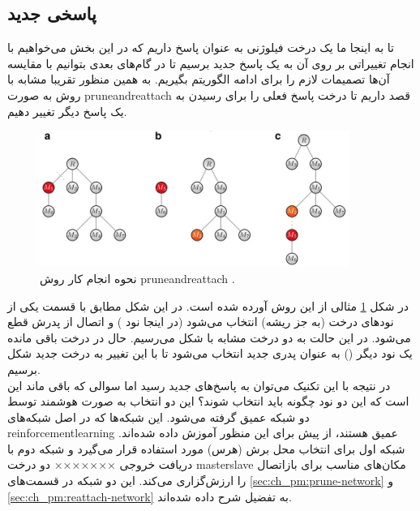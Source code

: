 \subsection{پاسخی جدید}
تا به اینجا ما یک درخت فیلوژنی به عنوان پاسخ داریم که در این بخش می‌خواهیم با انجام تغییراتی بر روی آن به یک پاسخ جدید برسیم تا در گام‌های بعدی بتوانیم با مقایسه آن‌ها تصمیمات لازم را برای ادامه الگوریتم بگیریم. به همین منظور تقریبا مشابه با روش \cite{davis2016computing} به صورت \gls{pruneandreattach} قصد داریم تا درخت پاسخ فعلی را برای رسیدن به یک پاسخ دیگر تغییر دهیم. 
\begin{figure}[!ht]
	\centering 
	\includegraphics[width=0.9\textwidth]{img/chaps/pm/pruneandreattach}
	\caption{نحوه انجام کار روش \gls{pruneandreattach} \cite{davis2016computing}.}    
	\label{fig:ch_pm:pruneandreattach}
\end{figure}
در شکل \ref{fig:ch_pm:pruneandreattach} مثالی از این روش آورده شده است. در این شکل مطابق با قسمت  یکی از نودهای درخت (به جز ریشه) انتخاب می‌شود (در اینجا نود ) و اتصال از پدرش قطع می‌شود. در این حالت به دو درخت مشابه با شکل  می‌رسیم. حال در درخت باقی مانده یک نود دیگر  () به عنوان پدری جدید انتخاب می‌شود تا با این تغییر به درخت جدید شکل  برسیم.
\\
در نتیجه با این تکنیک می‌توان به پاسخ‌های جدید رسید اما سوالی که باقی ماند این است که این دو نود چگونه باید انتخاب شوند؟ 
این دو انتخاب به صورت هوشمند توسط دو شبکه عمیق گرفته می‌شود. این شبکه‌ها که در اصل شبکه‌های \gls{reinforcementlearning} عمیق هستند، از پیش برای این منظور آموزش داده شده‌اند.
%		
شبکه اول برای انتخاب محل برش (هرس) مورد استفاده قرار می‌گیرد و شبکه دوم با دریافت خروجی ××××××× دو درخت \gls{masterslave} مکان‌های مناسب برای بازاتصال را ارزش‌گزاری می‌کند. این دو شبکه در قسمت‌های \ref{sec:ch_pm:prune-network} و \ref{sec:ch_pm:reattach-network} به تفضیل شرح داده شده‌اند.

